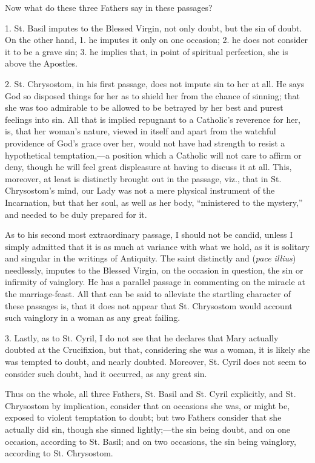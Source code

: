 Now what do these three Fathers say in these passages?


1. St. Basil imputes to the Blessed Virgin, not only doubt, but the
sin of doubt. On the other hand, 1. he imputes it only on one occasion;
2. he does not consider it to be a grave sin; 3. he implies that, in
point of spiritual perfection, she is above the Apostles.


2. St. Chrysostom, in his first passage, does not impute sin to
her at all. He says God so disposed things for her as to shield her
from the chance of sinning; that she was too admirable to be allowed to
be betrayed by her best and purest feelings into sin. All that is
implied repugnant to a Catholic's reverence for her, is, that her woman's
nature, viewed in itself and apart from the watchful providence of God's
grace over her, would not have had strength to resist a hypothetical
temptation,—a position which a Catholic will not care to affirm or
deny, though he will feel great displeasure at having to discuss it at
all. This, moreover, at least is distinctly brought out in the passage,
viz., that in St. Chrysostom's mind, our Lady was not a mere physical
instrument of the Incarnation, but that her soul, as well as her body,
``ministered to the mystery,'' and needed to be duly prepared
for it.


As to his second most extraordinary passage, I should not be candid,
unless I simply admitted that it is as much at variance with what we
hold, as it is solitary and singular in the writings of Antiquity. The
saint distinctly and (\emph{pace illius}) needlessly, imputes to the
Blessed Virgin, on the occasion in question, the sin or infirmity of
vainglory. He has a parallel passage in commenting on the miracle at the
marriage-feast. All that can be said to alleviate the startling
character of these passages is, that it does not appear that St.
Chrysostom would account such vainglory in a woman as any great failing.


3. Lastly, as to St. Cyril, I do not see that he declares that Mary
actually doubted at the Crucifixion, but that, considering she was a
woman, it is likely she was tempted to doubt, and nearly doubted.
Moreover, St. Cyril does not seem to consider such doubt, had it
occurred, as any great sin.


Thus on the whole, all three Fathers, St. Basil and St. Cyril
explicitly, and St. Chrysostom by implication, consider that on occasions
she was, or might be, exposed to violent temptation to doubt; but two
Fathers consider that she actually did sin, though she sinned lightly;—the
sin being doubt, and on one occasion, according to St. Basil; and on two
occasions, the sin being vainglory, according to St. Chrysostom.


